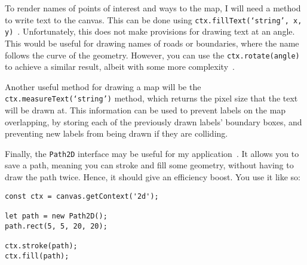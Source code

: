 To render names of points of interest and ways to the map, I will need a method to write text to the canvas. This can be done using \texttt{ctx.fillText(`string', x, y)}~\cite{mdn-canvas-draw-text}. Unfortunately, this does not make provisions for drawing text at an angle. This would be useful for drawing names of roads or boundaries, where the name follows the curve of the geometry. However, you can use the \texttt{ctx.rotate(angle)} to achieve a similar result, albeit with some more complexity~\cite{mdn-canvas-rotating}.

Another useful method for drawing a map will be the \texttt{ctx.measureText(`string')} method, which returns the pixel size that the text will be drawn at. This information can be used to prevent labels on the map overlapping, by storing each of the previously drawn labels' boundary boxes, and preventing new labels from being drawn if they are colliding.

Finally, the \texttt{Path2D} interface may be useful for my application~\cite{mdn-canvas-path-2d}. It allows you to save a path, meaning you can stroke and fill some geometry, without having to draw the path twice. Hence, it should give an efficiency boost. You use it like so:

\begin{lstlisting}
const ctx = canvas.getContext('2d');

let path = new Path2D();
path.rect(5, 5, 20, 20);

ctx.stroke(path);
ctx.fill(path);
\end{lstlisting}
